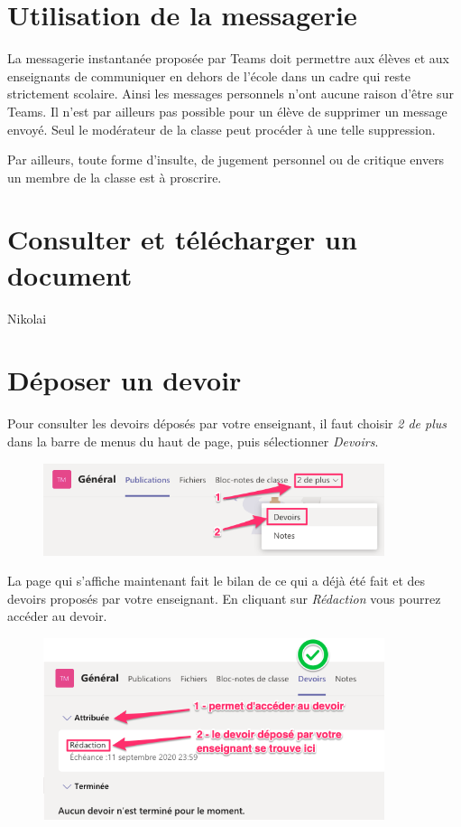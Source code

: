 \documentclass{article}
\begin{document}
\newpage

\section{Utilisation de la messagerie}

La messagerie instantanée proposée par Teams doit permettre aux élèves et aux enseignants de communiquer en dehors de l'école dans un cadre qui reste strictement scolaire. Ainsi les messages personnels n'ont aucune raison d'être sur Teams. Il n'est par ailleurs pas possible pour un élève de supprimer un message envoyé. Seul le modérateur de la classe peut procéder à une telle suppression. 

Par ailleurs, toute forme d'insulte, de jugement personnel ou de critique envers un membre de la classe est à proscrire.



\section{Consulter et télécharger un document}

Nikolai

\section{Déposer un devoir}

Pour consulter les devoirs déposés par votre enseignant, il faut choisir \textit{2 de plus} dans la barre de menus du haut de page, puis sélectionner \textit{Devoirs}.

\begin{figure}[h]
\includegraphics[width=10cm]{devoir1.png}
\centering
\end{figure}

La page qui s'affiche maintenant fait le bilan de ce qui a déjà été fait et des devoirs proposés par votre enseignant. En cliquant sur \textit{Rédaction} vous pourrez accéder au devoir.

\begin{figure}[h]
\includegraphics[width=10cm]{devoir2.png}
\centering
\end{figure}
\end{document}
